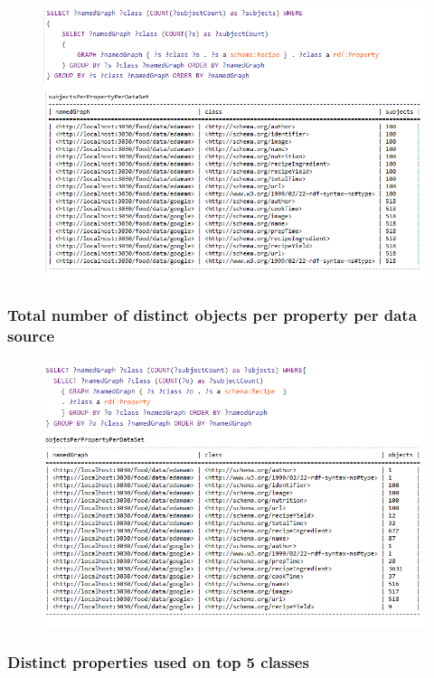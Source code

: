 \documentclass{article}
\begin{document}
\begin{figure}[H]
  \centering
  \includegraphics[width=13cm]{pictures/res8_sub_per_class_per_datasource.png}
  \label{fig:qures8}
\end{figure}

\subsubsection{Total number of distinct objects per property per data source}

\begin{figure}[H]
  \centering
  \includegraphics[width=12cm]{pictures/res9_obj_per_class_per_datasource.png}
  \label{fig:qures9}
\end{figure}

\subsubsection{Distinct properties used on top 5 classes}
\end{document}
